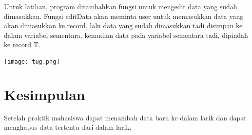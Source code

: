 \documentclass[a4paper,12pt]{article}
\begin{document}
Untuk latihan, program ditambahkan fungsi untuk mengedit data yang sudah dimasukkan.
Fungsi editData akan meminta user untuk memasukkan data yang akan dimasukkan ke record,
lalu data yang sudah dimasukkan tadi disimpan ke dalam variabel sementara, kemudian 
data pada variabel sementara tadi, dipindah ke record T.
\begin{center}
    \texttt{[image: tug.png]} 
\end{center}

\newpage

\section{Kesimpulan}
Setelah praktik mahasiswa dapat menambah data baru ke dalam larik dan dapat menghapus data tertentu dari dalam larik.
\end{document}
